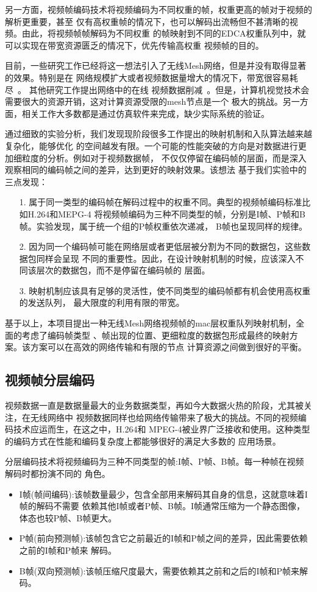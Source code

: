 另一方面，视频帧编码技术将视频编码为不同权重的帧，权重更高的帧对于视频的解析更重要，甚至
仅有高权重帧的情况下，也可以解码出流畅但不甚清晰的视频。由此，将视频帧帧解码为不同权重
的帧映射到不同的EDCA权重队列中，就可以实现在带宽资源匮乏的情况下，优先传输高权重
视频帧的目的。

目前，一些研究工作已经将这一想法引入了无线Mesh网络，但是并没有取得显著的效果。特别是在
网络规模扩大或者视频数据量增大的情况下，带宽很容易耗尽~\cite{Iptvhome}。
其他研究工作提出网络中的在线
视频数据削减~\cite{W4}。但是，计算机视觉技术会需要很大的资源开销，这对计算资源受限的mesh节点是一个
极大的挑战。另一方面，相关工作大多数都是通过仿真软件来完成，缺少实际系统的验证。

通过细致的实验分析，我们发现现阶段很多工作提出的映射机制和入队算法越来越复杂化，能够优化
的空间越发有限。一个可能的性能突破的方向是对数据进行更加细粒度的分析。例如对于视频数据帧，
不仅仅停留在编码帧的层面，而是深入观察相同的编码帧之间的差异，达到更好的映射效果。该想法
基于我们实验中的三点发现：
\begin{itemize}
\item[1.] 属于同一类型的编码帧在解码过程中的权重不同。典型的视频帧编码标准比如H.264和MEPG-4
将视频帧编码为三种不同类型的帧，分别是I帧、P帧和B帧。实验发现，属于统一个组的P帧权重依次递减，
B帧也呈现同样的规律。
\item[2.] 因为同一个编码帧可能在网络层或者更低层被分割为不同的数据包，这些数据包同样会呈现
不同的重要性。因此，在设计映射机制的时候，应该深入不同该层次的数据包，而不是停留在编码帧的
层面。
\item[3.] 映射机制应该具有足够的灵活性，使不同类型的编码帧都有机会使用高权重的发送队列，
最大限度的利用有限的带宽。
\end{itemize}

基于以上，本项目提出一种无线Mesh网络视频帧的mac层权重队列映射机制，全面的考虑了编码帧类型
、帧出现的位置、更细粒度的数据包形成最终的映射方案。该方案可以在高效的网络传输和有限的节点
计算资源之间做到很好的平衡。

\subsection{视频帧分层编码}
视频数据一直是数据量最大的业务数据类型，再如今大数据火热的阶段，尤其被关注，在无线网络中
视频数据同样也给网络传输带来了极大的挑战。不同的视频编码技术应运而生，在这之中，H.264和
MPEG-4被业界广泛接收和使用。这种类型的编码方式在性能和编码复杂度上都能够很好的满足大多数的
应用场景。

分层编码技术将视频编码为三种不同类型的帧:I帧、P帧、B帧。每一种帧在视频解码时都扮演不同的
角色。
\begin{itemize}
\item I帧(帧间编码):该帧数量最少，包含全部用来解码其自身的信息，这就意味着I帧的解码不需要
依赖其他I帧或者P帧、B帧。I帧通常压缩为一个静态图像，体态也较P帧、B帧更大。
\item P帧(前向预测帧):该帧包含它之前最近的I帧和P帧之间的差异，因此需要依赖之前的I帧和P帧来
解码。
\item B帧(双向预测帧):该帧压缩尺度最大，需要依赖其之前和之后的I帧和P帧来解码。
\end{itemize}

